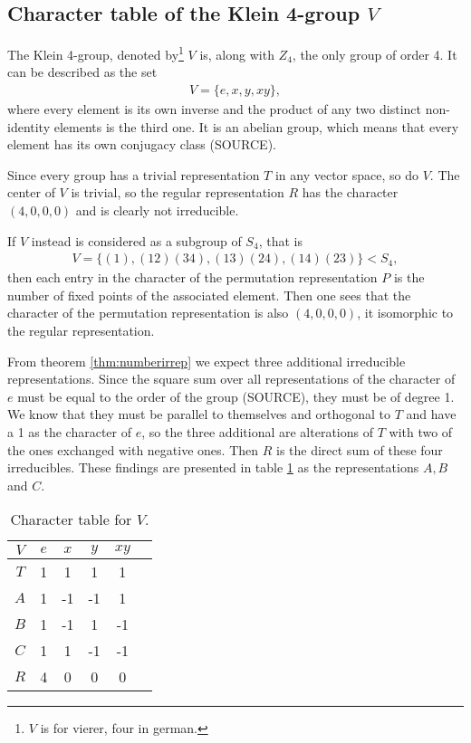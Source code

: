 \subsection{Character table of the Klein 4-group $V$}

The Klein 4-group, denoted by\footnote{$V$ is for vierer, four in german.} $V$ is, along with $Z_4$, the only group of order 4. It can be described as the set
\begin{align}
	V = \{ e, x, y, xy \},
\end{align}
where every element is its own inverse and the product of any two distinct non-identity elements is the third one.
It is an abelian group, which means that every element has its own conjugacy class (SOURCE).

Since every group has a trivial representation $T$ in any vector space, so do $V$. The center of $V$ is trivial, so the regular representation $R$ has the character $(4,0,0,0)$ and is clearly not irreducible.

If $V$ instead is considered as a subgroup of $S_4$, that is
\begin{align}
	V = \{ (1), (12)(34), (13)(24), (14)(23) \} < S_4,
\end{align}
then each entry in the character of the permutation representation $P$ is the number of fixed points of the associated element. Then one sees that the character of the permutation representation is also $(4,0,0,0)$, it isomorphic to the regular representation.

From theorem \ref{thm:numberirrep} we expect three additional irreducible representations. Since the square sum over all representations of the character of $e$ must be equal to the order of the group (SOURCE), they must be of degree 1. We know that they must be parallel to themselves and orthogonal to $T$ and have a 1 as the character of $e$, so the three additional are alterations of $T$ with two of the ones exchanged with negative ones. Then $R$ is the direct sum of these four irreducibles. These findings are presented in table \ref{table:charV} as the representations $A, B$ and $C$.


\begin{table}[hbt!]
	\centering
	\begin{tabular}{c | c c c c l}
		$V$ & $e$ & $x$ & $y$ & $xy$ &             \\ \hline
		$T$ & 1   & 1   & 1   & 1   &             \\
		$A$ & 1   & -1  & -1  & 1   &             \\
		$B$ & 1   & -1  & 1   & -1  &             \\
		$C$ & 1   & 1   & -1  & -1  &             \\ \hline\hline
		$R$ & 4   & 0   & 0   & 0   & %
	\end{tabular}
	\caption{Character table for $V$.}
	\label{table:charV}
\end{table}